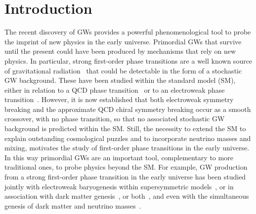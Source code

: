 \documentclass[a4paper,11pt]{article}
\begin{document}
\def\ve{\varepsilon}
\def\vf{\varphi}
\def\vr{\varrho}
\def\vs{\varsigma}
\def\vq{\vartheta}


\def\dg{\dagger}                                     %
\def\ddg{\ddagger}                                   %
\def\wt#1{\widetilde{#1}}                    %
\def\mt{\widetilde{m}_1}
\def\mti{\widetilde{m}_i}
\def\mtj{\widetilde{m}_j}
\def\rt{\widetilde{r}_1}
\def\mtt{\widetilde{m}_2}
\def\mttt{\widetilde{m}_3}
\def\rtt{\widetilde{r}_2}
\def\mb{\overline{m}}
\def\VEV#1{\left\langle #1\right\rangle}        %
\def\be{\begin{equation}}
\def\ee{\end{equation}}
\def\ds{\displaystyle}
\def\ra{\rightarrow}

\def\bea{\begin{eqnarray}}
\def\eea{\end{eqnarray}}
\def\NO{\nonumber}
\def\Bar#1{\overline{#1}}
\def\ylz{\textcolor{red}}



\section{Introduction} 

The recent discovery of GWs provides a powerful phenomenological tool to probe the imprint of new physics in the 
early universe. Primordial GWs that survive until the present could have  been produced by mechanisms that rely on new physics.  
In particular, strong first-order phase transitions  are a well known source of 
gravitational radiation~\cite{Witten:1984rs,Hogan:1986qda,Turner:1990rc} that could be
detectable in the form of  a stochastic GW background.  These have been 
studied within the standard model (SM), either in relation to a QCD phase transition~\cite{Witten:1984rs}
or to an electroweak phase transition~\cite{Kamionkowski:1993fg}. 
However, it is now established that both electroweak symmetry breaking and 
the approximate QCD chiral symmetry breaking occur 
as a smooth crossover, with no phase transition, so that no associated 
stochastic GW background is predicted within the SM. 
Still, the necessity to extend the SM
to explain outstanding cosmological puzzles and to incorporate neutrino masses and mixing,
motivates the study of first-order phase transitions in the early universe. 
In this way primordial GWs are
an important tool, complementary to more traditional ones, to probe physics beyond the SM.
For example, GW production  from  a strong first-order phase transition in the early universe has been studied  
jointly with electroweak baryogenesis   within supersymmetric models~\cite{Apreda:2001us},
or in association with dark matter genesis~\cite{Witten:1984rs,Bai:2018dxf}, or both~\cite{Huang:2017kzu,Hall:2019rld}, and even
with the simultaneous genesis of dark matter and  neutrino masses~\cite{DiBari:2020bvn}.
\end{document}
